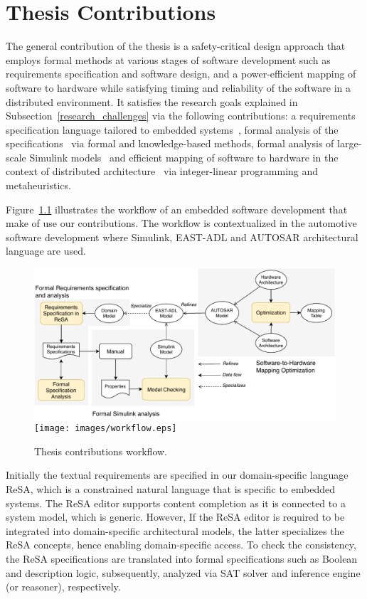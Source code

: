 \chapter{Thesis Contributions}
The general contribution of the thesis is a safety-critical design approach that employs formal methods at various stages of software development such as requirements specification and software design, and a power-efficient mapping of software to hardware while satisfying timing and reliability of the software in a distributed environment. It satisfies the research goals explained in Subsection~\ref{research_challenges} via the following contributions: a requirements specification language tailored to embedded systems~\cite{Mahmud2015ReSA:Systems}\cite{resatool}, formal analysis of the specifications~\cite{resatool}\cite{Mahmud2017SpecificationLogic} via formal and knowledge-based methods, formal analysis of large-scale Simulink models~\cite{Filipovikj2018SimppaalModels} and efficient mapping of software to hardware in the context of distributed architecture~\cite{Mahmud5222}\cite{Mahmud2019Power-awareOptimization} via integer-linear programming and metaheuristics. 

Figure~\ref{fig_workflow} illustrates the workflow of an embedded software development that make of use our contributions. The workflow is contextualized in the automotive software development where Simulink, EAST-ADL and AUTOSAR architectural language are used. 
\begin{figure}[h]
	\centering
	\ifpdf
	\includegraphics[width=\linewidth]{images/workflow}
	\else
	\texttt{[image: images/workflow.eps]}
	\fi
	\caption{Thesis contributions workflow.} 
	\label{fig_workflow}
\end{figure}

Initially the textual requirements are specified in our domain-specific language ReSA, which is a constrained natural language that is specific to embedded systems. The ReSA editor supports content completion as it is connected to a system model, which is generic. However, If the ReSA editor is required to be integrated into  domain-specific architectural models, the latter specializes the ReSA concepts, hence enabling domain-specific access. To check the consistency, the ReSA specifications are translated into formal specifications such as Boolean and description logic, subsequently, analyzed via SAT solver and inference engine (or reasoner), respectively.

